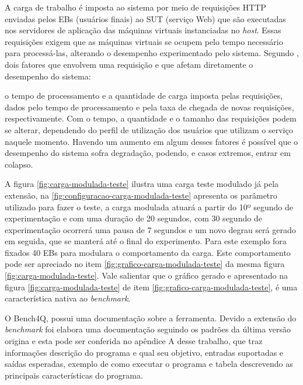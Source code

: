 A carga de trabalho é imposta ao sistema por meio de requisições HTTP enviadas pelos EBs (usuários finais) ao SUT (serviço Web) que são executadas nos servidores de aplicação das máquinas virtuais instanciadas no \textit{host}. Essas requisições exigem que as máquinas virtuais se ocupem pelo tempo necessário para processá-las, alterando o desempenho experimentado pelo sistema.
Segundo , dois fatores que envolvem uma requisição e que afetam diretamente o desempenho do sistema:
\begin{citacao}
	o tempo de processamento e a quantidade de carga imposta pelas requisições, dados pelo tempo de processamento e pela taxa de chegada de novas requisições, respectivamente. Com o tempo, a quantidade e o tamanho das requisições podem se alterar, dependendo do perfil de utilização dos usuários que utilizam o serviço naquele momento. Havendo um aumento em algum desses fatores é possível que o desempenho do sistema sofra degradação, podendo, e casos extremos, entrar em colapso.
\end{citacao}


A figura \ref{fig:carga-modulada-teste} ilustra uma carga teste modulado já pela extensão, na \ref{fig:configuracao-carga-modulada-teste} apresenta os parâmetro utilizado para fazer o teste, a carga modulada atuará a partir do 10º segundo de experimentação e com uma duração de 20 segundos, com 30 segundo de experimentação ocorrerá uma pausa de 7 segundos e um novo degrau será gerado em seguida, que se manterá até o final do experimento. Para este exemplo fora fixados 40 EBs para modulara o comportamento da carga. Este comportamento pode ser apreciado no item \ref{fig:grafico-carga-modulada-teste} da mesma figura \ref{fig:carga-modulada-teste}. Vale salientar que o gráfico gerado e apresentado na figura \ref{fig:carga-modulada-teste} de item \ref{fig:grafico-carga-modulada-teste}, é uma característica nativa ao \textit{benchmark}.

O Bench4Q, possui uma documentação sobre a ferramenta. Devido a extensão do \textit{benchmark} foi elabora uma documentação seguindo os padrões da última versão origina e esta pode ser conferida no apêndice A desse trabalho, que traz informações descrição do programa e qual seu objetivo, entradas suportadas e saídas esperadas, exemplo de como executar o programa e tabela descrevendo as principais características do programa.